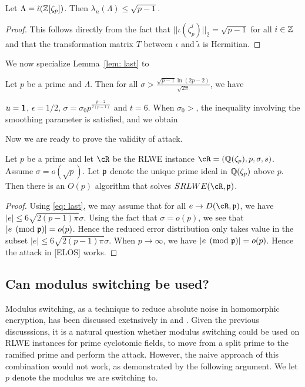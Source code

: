 \documentclass{amsart}
\begin{document}
\begin{Lemma}
Let $\Lambda = \tilde{\iota}(\mathbb{Z}[\zeta_p])$. Then $\lambda_n(\Lambda) \leq \sqrt{p-1}$.
\end{Lemma}

\begin{proof}
This follows directly from the fact that $||\iota(\zeta_p^i)||_2 = \sqrt{p-1}$ for all $i \in \mathbb{Z}$ and that the transformation matrix $T$ between $\iota$ and $\tilde{\iota}$ is Hermitian.
\end{proof}


We now specialize Lemma~\ref{lem: last} to

\begin{Prop}
Let $p$ be a prime and $\Lambda$. Then for all $\sigma > \frac{\sqrt{p-1} \ln(2p-2)}{\sqrt{2 \pi}}$, we have
\end{Prop}
$u = {\bf 1}$, $\epsilon = 1/2$, $\sigma = \sigma_0 p^{\frac{p-2}{2(p-1)}}$ and $t = 6$. When $\sigma_0 > $, the inequality involving the smoothing parameter is satisfied, and we obtain

Now we are ready to prove the validity of attack.
\begin{theorem}
Let $p$ be a prime and let $\cR$ be the RLWE instance $\cR = (\bQ(\zeta_p), p, \sigma,s)$.
Assume $\sigma = o(\sqrt{p})$. Let $\mathfrak{p}$ denote the unique prime ideal in $\mathbb{Q}(\zeta_p)$ above $p$. Then there is an $O(p)$ algorithm that solves $SRLWE(\cR,\fp)$.
\end{theorem}

\begin{proof}
Using \ref{eq: last}, we may assume that for all $e \to D(\cR,\fp)$, we have $|e|\leq 6\sqrt{2(p-1)\pi} \sigma$. Using the fact that $\sigma = o(p)$, we see that $|e \pmod{\mathfrak{p}}| = o(p)$. Hence the reduced error distribution only takes value in the subset
$|e|\leq 6\sqrt{2(p-1)\pi} \sigma$. When $p \to \infty$, we have $|e \pmod {\mathfrak{p}}| = o(p)$.  Hence the attack in [ELOS] works.
\end{proof}
\fi

\subsection{Can modulus switching be used?}
Modulus switching, as a technique to reduce absolute noise
in homomorphic encryption, has been discussed exetnsively in  \cite{brakerski2012leveled} and \cite{langlois2014worst}.
Given the previous discusssions, it is a natural question whether modulus switching
could be used on RLWE instances for prime cyclotomic fields, to move from a split prime to the ramified prime and perform the attack. However, the naive approach of this combination would not work, as demonstrated by the following argument.
We let $p$ denote the modulus we are switching to.
\end{document}
